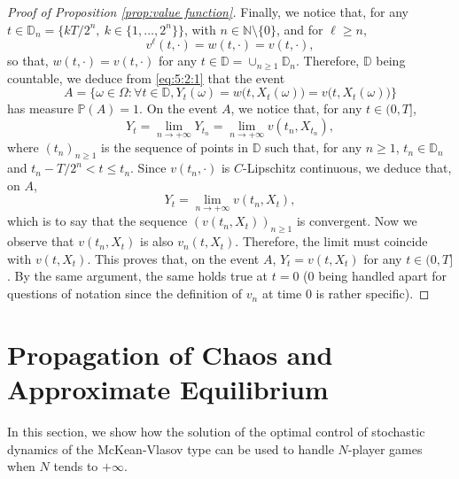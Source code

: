 \documentclass[11pt]{amsart}
\begin{document}
\begin{proof}[Proof of Proposition \ref{prop:value function}]
Finally, we notice that, for any $t \in {\mathbb D}_{n} = \{k T/2^n, \ k \in \{1,\dots,2^n\}\}$, with $n \in {\mathbb N} \setminus \{0\}$, and for $\ell \geq n$,
\begin{equation*}
v^{\ell}(t,\cdot) = w(t,\cdot) = v(t,\cdot), 
\end{equation*}
so that, $w(t,\cdot)=v(t,\cdot)$ for any $t \in {\mathbb D} = \cup_{n \geq 1} {\mathbb D}_{n}$. Therefore,  
${\mathbb D}$ being countable, we deduce from \eqref{eq:5:2:1} that
the event 
\begin{equation*}
A = \bigl\{\omega \in \Omega : \forall t \in {\mathbb D}, Y_{t}(\omega) = w\bigl(t,X_{t}(\omega)\bigr) = v\bigl(t,X_{t}(\omega) \bigr) \bigr\}
\end{equation*}
has measure ${\mathbb P}(A)=1$. On the event $A$, we notice that, for any $t \in (0,T]$,
\begin{equation*}
Y_{t} = \lim_{n \rightarrow + \infty} Y_{t_{n}} = \lim_{n \rightarrow + \infty} v(t_{n},X_{t_{n}}),
\end{equation*}
where $(t_{n})_{n \geq 1}$ is the sequence of points in ${\mathbb D}$ such that, for any $n \geq 1$, 
$t_{n} \in {\mathbb D}_{n}$ and $t_{n}-T/2^n < t \leq t_{n}$.  
Since $v(t_{n},\cdot)$ is $C$-Lipschitz continuous, we deduce that, on $A$,
\begin{equation*}
Y_{t} = \lim_{n \rightarrow + \infty} v(t_{n},X_{t}),
\end{equation*}
which is to say that the sequence $(v(t_{n},X_{t}))_{n \geq 1}$ is convergent. Now we observe that $v(t_{n},X_{t})$ is also 
$v_{n}(t,X_{t})$.
Therefore, the limit must coincide with 
$v(t,X_{t})$. This proves that, on the event $A$, $Y_{t} = v(t,X_{t})$ for any $t \in (0,T]$. By the same argument, the same holds true at $t=0$ ($0$ being handled apart for questions of notation since the definition of $v_{n}$ at time $0$ is rather specific).  
\end{proof}

\section{\textbf{Propagation of Chaos and Approximate Equilibrium}}
\label{se:chaos}

In this section, we show how the solution of the optimal control of stochastic dynamics of the McKean-Vlasov type can be used to
handle $N$-player games when $N$ tends to $+\infty$. 
\end{document}
